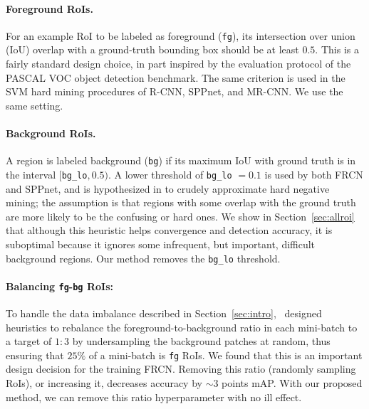 \documentclass[10pt,twocolumn,letterpaper]{article}
\begin{document}
\paragraph{Foreground RoIs.} For an example RoI to be labeled as foreground (\texttt{fg}), its intersection over union (IoU) overlap with a ground-truth bounding box should be at least $0.5$. This is a fairly standard design choice, in part inspired by the evaluation protocol of the PASCAL VOC object detection benchmark. The same criterion is used in the SVM hard mining procedures of R-CNN, SPPnet, and MR-CNN. We use the same setting.

\vspace{-0.1in}
\paragraph{Background RoIs.}  A region is labeled background (\texttt{bg}) if its maximum IoU with ground truth is in the interval $[$\texttt{bg\_lo}$, 0.5)$. A lower threshold of \texttt{bg\_lo} $=0.1$ is used by both FRCN and SPPnet, and is hypothesized in \cite{frcn} to crudely approximate hard negative mining; the assumption is that regions with some overlap with the ground truth are more likely to be the confusing or hard ones. We show in Section~\ref{sec:allroi} that although this heuristic helps convergence and detection accuracy, it is suboptimal because it ignores some infrequent, but important, difficult background regions. Our method removes the \texttt{bg\_lo} threshold.

\vspace{-0.1in}
\paragraph{Balancing \texttt{fg}-\texttt{bg} RoIs:}
To handle the data imbalance described in Section~\ref{sec:intro},~\cite{frcn} designed heuristics to rebalance the foreground-to-background ratio in each mini-batch to a target of $1:3$ by undersampling the background patches at random, thus ensuring that $25\%$ of a mini-batch is \texttt{fg} RoIs. We found that this is an important design decision for the training FRCN. Removing this ratio (\ie randomly sampling RoIs), or increasing it, decreases accuracy by ${\sim}3$ points mAP. With our proposed method, we can remove this ratio hyperparameter with no ill effect.
\end{document}
